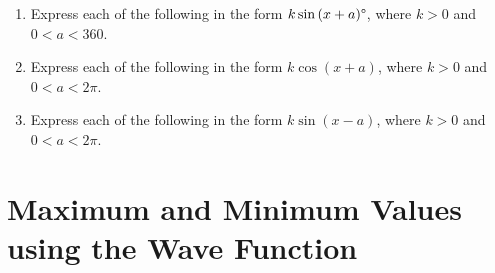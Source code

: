 \documentclass[
  11pt,
  openany]{book}
\begin{document}
\vspace{-0.3cm}

\begin{enumerate}
    \item Express each of the following in the form $k\sin{(x+a)}\degree$, where $k>0$ and $0<a<360$. \faCalculator
    \vspace{-0.2cm}
    \begin{enumerate}
    \end{enumerate}
    \item Express each of the following in the form $k\cos{(x+a)}$, where $k>0$ and $0<a<2\pi$. \faCalculator
    \vspace{-0.2cm}
    \begin{enumerate}
    \end{enumerate}
    \item Express each of the following in the form $k\sin{(x-a)}$, where $k>0$ and $0<a<2\pi$.
    \vspace{-0.2cm}
    \begin{enumerate}
    \end{enumerate}
\end{enumerate}

\pagebreak

\section{Maximum and Minimum Values using the Wave Function}\label{maximum-and-minimum-values-using-the-wave-function}
\end{document}
